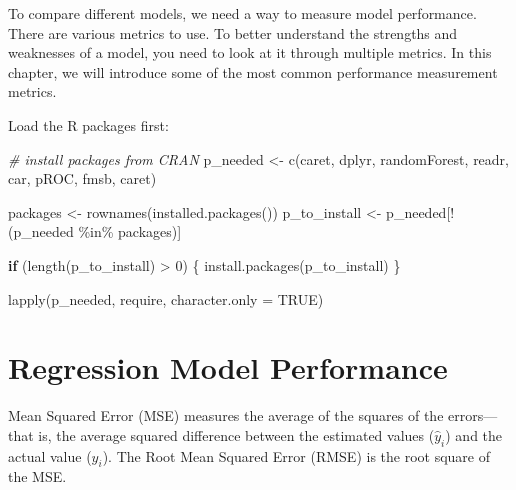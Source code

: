 \documentclass[
  12pt,
]{krantz}
\makeatletter
\newenvironment{Shaded}{\begin{snugshade}}{\end{snugshade}}
\newcommand{\AttributeTok}[1]{\textcolor[rgb]{0.61,0.61,0.61}{#1}}
\newcommand{\CommentTok}[1]{\textcolor[rgb]{0.37,0.37,0.37}{\textit{#1}}}
\newcommand{\ConstantTok}[1]{\textcolor[rgb]{0,0,0}{#1}}
\newcommand{\ControlFlowTok}[1]{\textcolor[rgb]{0.27,0.27,0.27}{\textbf{#1}}}
\newcommand{\DecValTok}[1]{\textcolor[rgb]{0.06,0.06,0.06}{#1}}
\newcommand{\FunctionTok}[1]{\textcolor[rgb]{0,0,0}{#1}}
\newcommand{\NormalTok}[1]{#1}
\newcommand{\OtherTok}[1]{\textcolor[rgb]{0.37,0.37,0.37}{#1}}
\newcommand{\SpecialCharTok}[1]{\textcolor[rgb]{0,0,0}{#1}}
\newcommand{\StringTok}[1]{\textcolor[rgb]{0.5,0.5,0.5}{#1}}
\newenvironment{kframe}{%
\medskip{}
\setlength{\fboxsep}{.8em}
 \def\at@end@of@kframe{}%
 \ifinner\ifhmode%
  \def\at@end@of@kframe{\end{minipage}}%
  \begin{minipage}{\columnwidth}%
 \fi\fi%
 \def\FrameCommand##1{\hskip\@totalleftmargin \hskip-\fboxsep
 \colorbox{shadecolor}{##1}\hskip-\fboxsep
     \hskip-\linewidth \hskip-\@totalleftmargin \hskip\columnwidth}%
 \MakeFramed {\advance\hsize-\width
   \@totalleftmargin\z@ \linewidth\hsize
   \@setminipage}}%
 {\par\unskip\endMakeFramed%
 \at@end@of@kframe}
\renewenvironment{Shaded}{\begin{kframe}}{\end{kframe}}
\makeatother
\begin{document}
To compare different models, we need a way to measure model performance. There are various metrics to use. To better understand the strengths and weaknesses of a model, you need to look at it through multiple metrics. In this chapter, we will introduce some of the most common performance measurement metrics.

Load the R packages first:

\begin{Shaded}
\begin{Highlighting}[]
\CommentTok{\# install packages from CRAN}
\NormalTok{p\_needed }\OtherTok{\textless{}{-}} \FunctionTok{c}\NormalTok{(}\StringTok{\textquotesingle{}caret\textquotesingle{}}\NormalTok{, }\StringTok{\textquotesingle{}dplyr\textquotesingle{}}\NormalTok{, }\StringTok{\textquotesingle{}randomForest\textquotesingle{}}\NormalTok{,}
              \StringTok{\textquotesingle{}readr\textquotesingle{}}\NormalTok{, }\StringTok{\textquotesingle{}car\textquotesingle{}}\NormalTok{, }\StringTok{\textquotesingle{}pROC\textquotesingle{}}\NormalTok{, }\StringTok{\textquotesingle{}fmsb\textquotesingle{}}\NormalTok{, }\StringTok{\textquotesingle{}caret\textquotesingle{}}\NormalTok{)}

\NormalTok{packages }\OtherTok{\textless{}{-}} \FunctionTok{rownames}\NormalTok{(}\FunctionTok{installed.packages}\NormalTok{())}
\NormalTok{p\_to\_install }\OtherTok{\textless{}{-}}\NormalTok{ p\_needed[}\SpecialCharTok{!}\NormalTok{(p\_needed }\SpecialCharTok{\%in\%}\NormalTok{ packages)]}

\ControlFlowTok{if}\NormalTok{ (}\FunctionTok{length}\NormalTok{(p\_to\_install) }\SpecialCharTok{\textgreater{}} \DecValTok{0}\NormalTok{) \{}
    \FunctionTok{install.packages}\NormalTok{(p\_to\_install)}
\NormalTok{\}}

\FunctionTok{lapply}\NormalTok{(p\_needed, require, }\AttributeTok{character.only =} \ConstantTok{TRUE}\NormalTok{)}
\end{Highlighting}
\end{Shaded}

\hypertarget{regression-model-performance}{%
\section{Regression Model Performance}\label{regression-model-performance}}

Mean Squared Error (MSE) measures the average of the squares of the errors---that is, the average squared difference between the estimated values (\(\hat{y}_{i}\)) and the actual value (\(y_i\)). The Root Mean Squared Error (RMSE) is the root square of the MSE.
\end{document}
